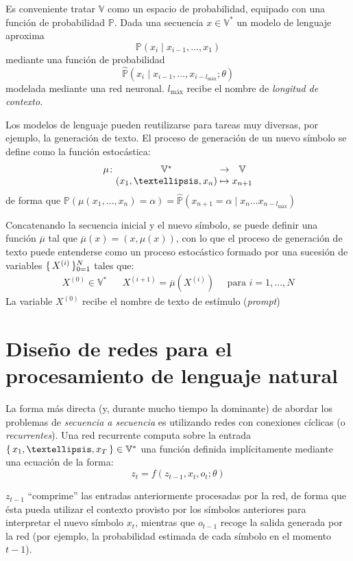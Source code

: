 Es conveniente tratar \( \mathbb{V} \) como un espacio de probabilidad, equipado con una función de probabilidad \( \mathbb{P} \). Dada una secuencia \( x \in \mathbb{V}^* \) un modelo de lenguaje aproxima 
\[
    \mathbb{P}(x_i \mid x_{i-1}, …, x_1)
\]  
mediante una función de probabilidad 
\[ \widehat{\mathbb{P}} \left( x_{i} \mid x_{i-1}, …, x_{i - l_\text{máx}}; \theta \right) 
\] 
modelada mediante una red neuronal. \( l_\text{máx} \) recibe el nombre de \textit{longitud de contexto}.

Los modelos de lenguaje pueden reutilizarse para tareas muy diversas, por ejemplo, la generación de texto. El proceso de generación de un nuevo símbolo se define como la función estocástica:
\[
    \myfunc{\mu}{\mathbb{V}^*}{\mathbb{V}}{(x_1, …, x_n)}{x_{n+1}}
\]
de forma que 
\(
    \mathbb{P}(\mu(x_1, …, x_n) = \alpha) = \widehat{\mathbb{P}} \left( x_{n+1} = \alpha \mid x_n … x_{n-l_\text{máx}} \right)
\)

Concatenando la secuencia inicial y el nuevo símbolo, se puede definir una función \( \overline{\mu} \) tal que \( \overline{\mu}(x) = (x, \mu(x)) \), con lo que el proceso de generación de texto puede entenderse como un proceso estocástico formado por una sucesión de variables \( \{\, X^{(i)} \,\}_{0 = 1}^N \) tales que:
\begin{align*}
X^{(0)} \in \mathbb{V}^* && X^{(i+1)} = \overline{\mu} (X^{(i)}) \quad \text{ para $i = 1, …, N$}
\end{align*}
La variable \( X^{(0)} \) recibe el nombre de texto de estímulo (\textit{prompt})

\section{Diseño de redes para el procesamiento de lenguaje natural}
La forma más directa (y, durante mucho tiempo la dominante) de abordar los problemas de \textit{secuencia a secuencia} es utilizando redes con conexiones cíclicas (o \textit{recurrentes}). Una red recurrente computa sobre la entrada \( \Set{ x_{1}, …, x_T } \in \mathbb{V}^* \) una función definida implícitamente mediante una ecuación de la forma:
\begin{equation} \label{eq:rnn}
    z_{t} = f(z_{t-1}, x_{t}, o_{t}; \theta)
\end{equation}

\( z_{t-1} \) ``comprime'' las entradas anteriormente procesadas por la red, de forma que ésta pueda utilizar el contexto provisto por los símbolos anteriores para interpretar el nuevo símbolo \( x_{t} \), mientras que \( o_{t - 1} \) recoge la salida generada por la red (por ejemplo, la probabilidad estimada de cada símbolo en el momento \( t - 1 \)).

